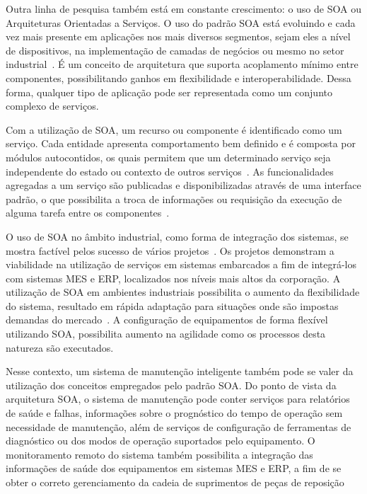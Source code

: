 Outra linha de pesquisa também está em constante crescimento: o uso de \gls{SOA} ou Arquiteturas
Orientadas a Serviços. O uso do padrão \gls{SOA} está evoluindo e cada vez mais presente em
aplicações nos mais diversos segmentos, sejam eles a nível de dispositivos, na implementação de
camadas de negócios ou mesmo no setor industrial~\cite{candido2010soa, choi2010impact,
ragavan2012service, papazoglou2007service}. É um conceito de arquitetura que suporta acoplamento
mínimo entre componentes, possibilitando ganhos em flexibilidade e interoperabilidade. Dessa forma,
qualquer tipo de aplicação pode ser representada como um conjunto complexo de serviços.

Com a utilização de \gls{SOA}, um recurso ou componente é identificado como um serviço. Cada
entidade apresenta comportamento bem definido e é composta por módulos autocontidos, os quais
permitem que um determinado serviço seja independente do estado ou contexto de outros
serviços~\cite{papazoglou2007service}. As funcionalidades agregadas a um serviço são publicadas e
disponibilizadas através de uma interface padrão, o que possibilita a troca de informações ou
requisição da execução de alguma tarefa entre os componentes~\cite{ragavan2012service}.

O uso de \gls{SOA} no âmbito industrial, como forma de integração dos sistemas, se mostra factível
pelos sucesso de vários projetos~\cite{karnouskos2010towards, bohn2006sirena, de2006soda,
colombo2010factory}. Os projetos demonstram a viabilidade na utilização de serviços em sistemas
embarcados a fim de integrá-los com sistemas \gls{MES} e \gls{ERP}, localizados nos níveis mais
altos da corporação. A utilização de \gls{SOA} em ambientes industriais possibilita o aumento da
flexibilidade do sistema, resultado em rápida adaptação para situações onde são impostas demandas do
mercado~\cite{starke2013flexible}. A configuração de equipamentos de forma flexível utilizando
\gls{SOA}, possibilita aumento na agilidade como os processos desta natureza são executados.



Nesse contexto, um sistema de manutenção inteligente também pode se valer da utilização dos
conceitos empregados pelo padrão \gls{SOA}. Do ponto de vista da arquitetura \gls{SOA}, o sistema de
manutenção pode conter serviços para relatórios de saúde e falhas, informações sobre o prognóstico
do tempo de operação sem necessidade de manutenção, além de serviços de configuração de ferramentas
de diagnóstico ou dos modos de operação suportados pelo equipamento. O monitoramento remoto do
sistema também possibilita a integração das informações de saúde dos equipamentos em sistemas
\gls{MES} e \gls{ERP}, a fim de se obter o correto gerenciamento da cadeia de suprimentos de peças
de reposição~\cite{oldham2003delivering}


